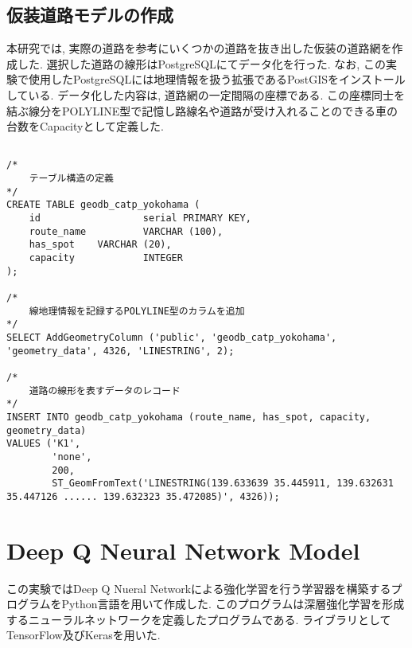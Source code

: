 \subsection{仮装道路モデルの作成}

本研究では, 実際の道路を参考にいくつかの道路を抜き出した仮装の道路網を作成した.
選択した道路の線形はPostgreSQLにてデータ化を行った. なお, この実験で使用したPostgreSQLには地理情報を扱う拡張であるPostGISをインストールしている.
データ化した内容は, 道路網の一定間隔の座標である. この座標同士を結ぶ線分をPOLYLINE型で記憶し路線名や道路が受け入れることのできる車の台数をCapacityとして定義した.

\begin{lstlisting}[caption = 路線データを表すクエリーの例, label = program1]

/*
    テーブル構造の定義
*/
CREATE TABLE geodb_catp_yokohama (
    id                  serial PRIMARY KEY,
    route_name          VARCHAR (100),
    has_spot    VARCHAR (20),
    capacity            INTEGER
);

/*
    線地理情報を記録するPOLYLINE型のカラムを追加
*/
SELECT AddGeometryColumn ('public', 'geodb_catp_yokohama', 'geometry_data', 4326, 'LINESTRING', 2);

/*
    道路の線形を表すデータのレコード
*/
INSERT INTO geodb_catp_yokohama (route_name, has_spot, capacity, geometry_data)
VALUES ('K1',
        'none',
        200,
        ST_GeomFromText('LINESTRING(139.633639 35.445911, 139.632631 35.447126 ...... 139.632323 35.472085)', 4326));
\end{lstlisting}



\section{Deep Q Neural Network Model}

この実験ではDeep Q Nueral Networkによる強化学習を行う学習器を構築するプログラムをPython言語を用いて作成した.
このプログラムは深層強化学習を形成するニューラルネットワークを定義したプログラムである.
ライブラリとしてTensorFlow及びKerasを用いた.


